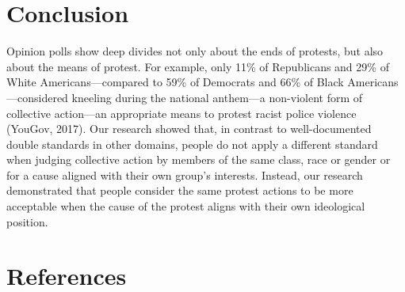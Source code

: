 \documentclass[12pt, letterpaper]{article}
\newcommand{\refsection}{\newpage \section{References}}
\begin{document}
\hypertarget{conclusion}{%
\section{Conclusion}\label{conclusion}}

Opinion polls show deep divides not only about the ends of protests, but
also about the means of protest. For example, only 11\% of Republicans
and 29\% of White Americans---compared to 59\% of Democrats and 66\% of
Black Americans---considered kneeling during the national anthem---a
non-violent form of collective action---an appropriate means to protest
racist police violence (YouGov, 2017). Our research showed that, in
contrast to well-documented double standards in other domains, people do
not apply a different standard when judging collective action by members
of the same class, race or gender or for a cause aligned with their own
group's interests. Instead, our research demonstrated that people
consider the same protest actions to be more acceptable when the cause
of the protest aligns with their own ideological position.

\refsection

\begingroup

\noindent \setlength{\parindent}{-0.5in} \setlength{\leftskip}{0.5in}
\small
\end{document}
